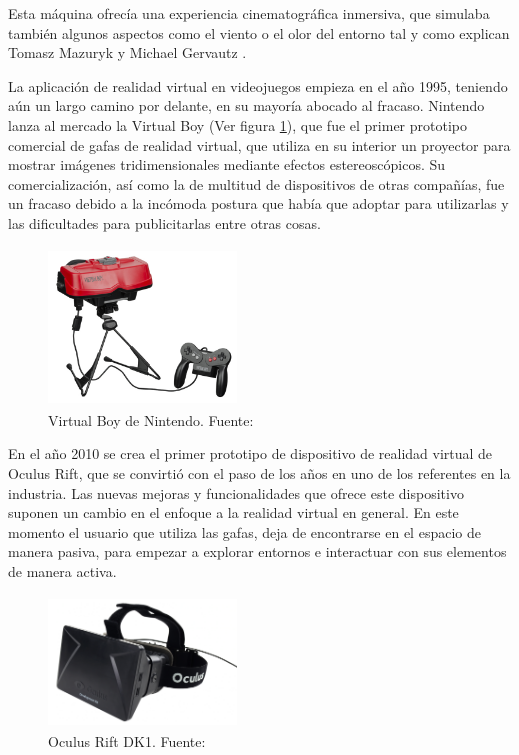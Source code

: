 \documentclass[../main.tex]{subfiles}
\begin{document}
Esta máquina ofrecía una experiencia cinematográfica inmersiva, que simulaba también algunos aspectos como el viento o el olor del entorno tal y como explican Tomasz Mazuryk y Michael Gervautz \cite{Tomasz_Michael}.

La aplicación de realidad virtual en videojuegos empieza en el año 1995, teniendo aún un largo camino por delante, en su mayoría abocado al fracaso. Nintendo lanza al mercado la Virtual Boy (Ver figura \ref{fig:Virtual_Boy}), que fue el primer prototipo comercial de gafas de realidad virtual, que utiliza en su interior un proyector para mostrar imágenes tridimensionales mediante efectos estereoscópicos. Su comercialización, así como la de multitud de dispositivos de otras compañías, fue un fracaso debido a la incómoda postura que había que adoptar para utilizarlas y las dificultades para publicitarlas entre otras cosas.

\begin{figure}[htbp]
\centering
\includegraphics[width=5cm, height= 4.2cm]{imagenes/Virtual_Boy.jpg}
\caption{Virtual Boy de Nintendo. Fuente:\cite{VirtualBoy}}
\label{fig:Virtual_Boy}
\end{figure}

En el año 2010 se crea el primer prototipo de dispositivo de realidad virtual de Oculus Rift, que se convirtió con el paso de los años en uno de los referentes en la industria. Las nuevas mejoras y funcionalidades que ofrece este dispositivo suponen un cambio en el enfoque a la realidad virtual en general. En este momento el usuario que utiliza las gafas, deja de encontrarse en el espacio de manera pasiva, para empezar a explorar entornos e interactuar con sus elementos de manera activa. 

\begin{figure}[htbp]
\centering
\includegraphics[width=5cm, height= 3.5cm]{imagenes/Oculus_Rift_DK1.png}
\caption{Oculus Rift DK1. Fuente:\cite{OculusDK1}}
\label{fig:OculusDK1}
\end{figure}
\end{document}

